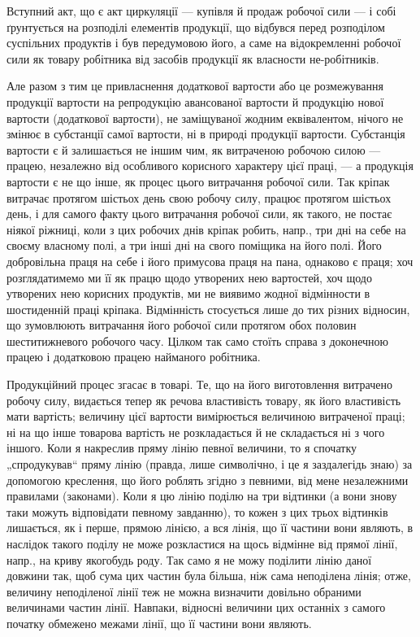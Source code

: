 Вступний акт, що є акт циркуляції — купівля й продаж робочої сили — і
собі ґрунтується на розподілі елементів продукції, що відбувся перед
розподілом суспільних продуктів і був передумовою його, а саме на
відокремленні робочої сили як товару робітника від засобів продукції
як власности не-робітників.

Але разом з тим це привласнення додаткової вартости або це розмежування
продукції вартости на репродукцію авансованої вартости й
продукцію нової вартости (додаткової вартости), не заміщуваної жодним
еквівалентом, нічого не змінює в субстанції самої вартости, ні в природі
продукції вартости. Субстанція вартости є й залишається не іншим чим,
як витраченою робочою силою — працею, незалежно від особливого корисного
характеру цієї праці, — а продукція вартости є не що інше, як процес
цього витрачання робочої сили. Так кріпак витрачає протягом шістьох
день свою робочу силу, працює протягом шістьох день, і для самого
факту цього витрачання робочої сили, як такого, не постає ніякої ріжниці,
коли з цих робочих днів кріпак робить, напр., три дні на себе на
своєму власному полі, а три інші дні на свого поміщика на його полі.
Його добровільна праця на себе і його примусова праця на пана, однаково
є праця; хоч розглядатимемо ми її як працю щодо утворених нею
вартостей, хоч щодо утворених нею корисних продуктів, ми не виявимо
жодної відмінности в шостиденній праці кріпака. Відмінність стосується
лише до тих різних відносин, що зумовлюють витрачання його робочої
сили протягом обох половин шеститижневого робочого часу. Цілком так
само стоїть справа з доконечною працею і додатковою працею найманого
робітника.

Продукційний процес згасає в товарі. Те, що на його виготовлення
витрачено робочу силу, видається тепер як речова властивість товару, як
його властивість мати вартість; величину цієї вартости вимірюється
величиною витраченої праці; ні на що інше товарова вартість не розкладається
й не складається ні з чого іншого. Коли я накреслив пряму
лінію певної величини, то я спочатку „спродукував“ пряму лінію (правда,
лише символічно, і це я заздалегідь знаю) за допомогою креслення, що
його роблять згідно з певними, від мене незалежними правилами (законами).
Коли я цю лінію поділю на три відтинки (а вони знову таки
можуть відповідати певному завданню), то кожен з цих трьох відтинків
лишається, як і перше, прямою лінією, а вся лінія, що її частини вони
являють, в наслідок такого поділу не може розкластися на щось відмінне
від прямої лінії, напр., на криву якогобудь роду. Так само я не можу
поділити лінію даної довжини так, щоб сума цих частин була більша,
ніж сама неподілена лінія; отже, величину неподіленої лінії теж не можна
визначити довільно обраними величинами частин лінії. Навпаки, відносні
величини цих останніх з самого початку обмежено межами лінії, що її
частини вони являють.

